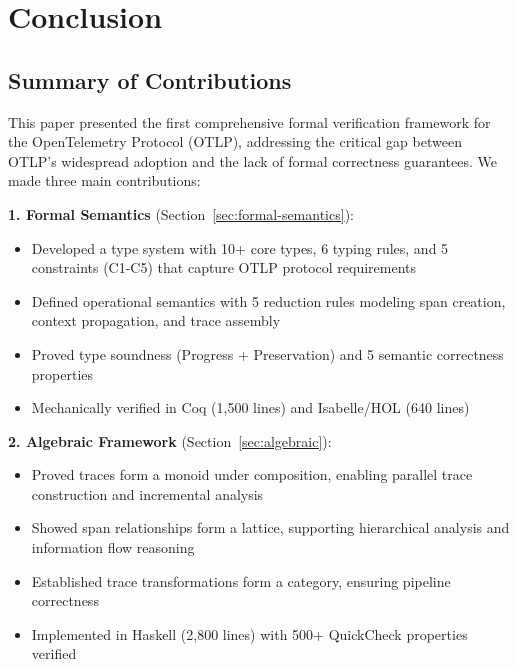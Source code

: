 
\section{Conclusion}
\label{sec:conclusion}

\subsection{Summary of Contributions}
\label{sec:contributions-summary}

This paper presented the first comprehensive formal verification framework for the OpenTelemetry Protocol (OTLP), addressing the critical gap between OTLP's widespread adoption and the lack of formal correctness guarantees. We made three main contributions:

\textbf{1. Formal Semantics} (Section~\ref{sec:formal-semantics}):
\begin{itemize}
\item Developed a type system with 10+ core types, 6 typing rules, and 5 constraints (C1-C5) that capture OTLP protocol requirements
\item Defined operational semantics with 5 reduction rules modeling span creation, context propagation, and trace assembly
\item Proved type soundness (Progress + Preservation) and 5 semantic correctness properties
\item Mechanically verified in Coq (1,500 lines) and Isabelle/HOL (640 lines)
\end{itemize}

\textbf{2. Algebraic Framework} (Section~\ref{sec:algebraic}):
\begin{itemize}
\item Proved traces form a monoid under composition, enabling parallel trace construction and incremental analysis
\item Showed span relationships form a lattice, supporting hierarchical analysis and information flow reasoning
\item Established trace transformations form a category, ensuring pipeline correctness
\item Implemented in Haskell (2,800 lines) with 500+ QuickCheck properties verified
\end{itemize}

